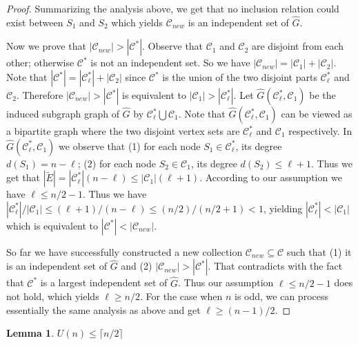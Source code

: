 \documentclass[11pt,letterpaper]{article}
\newtheorem{lemma}{Lemma}
\begin{document}
\begin{proof}
Summarizing the analysis above, we get that no inclusion relation could exist between $S_1$ and $S_2$
which yields $\mathcal{C}_{new} $ is an independent set of $\widehat{G}$.

Now we prove that $|\mathcal{C}_{new} |>|\mathcal{C}^* | $. Observe that
$\mathcal{C}_1$ and $\mathcal{C}_2$ are disjoint from each other; otherwise
 $\mathcal{C}^*$ is not an independent set. So we have $|\mathcal{C}_{new}|=|\mathcal{C}_1|+|\mathcal{C}_2|$.
Note that $|\mathcal{C}^*|=|\mathcal{C}^*_\ell|+|\mathcal{C}_2|$ since
$\mathcal{C}^*$ is the union of the two disjoint parts $\mathcal{C}^*_\ell$ and $\mathcal{C}_2$.
Therefore
$|\mathcal{C}_{new} |>|\mathcal{C}^* | $ is equivalent to $|\mathcal{C}_1 |>|\mathcal{C}^*_\ell | $.
Let $ \widehat{G}(\mathcal{C}^*_\ell, \mathcal{C}_1)$ be the
induced subgraph graph of $\widehat{G}$ by $\mathcal{C}^*_\ell \bigcup \mathcal{C}_1$.
Note that $ \widehat{G}(\mathcal{C}^*_\ell, \mathcal{C}_1)$ can be viewed as
a bipartite graph where the two disjoint vertex sets are $\mathcal{C}^*_\ell $ and $\mathcal{C}_1$
respectively.
In $ \widehat{G}(\mathcal{C}^*_\ell, \mathcal{C}_1)$
we observe that (1) for each node $S_1 \in \mathcal{C}^*_\ell$, its degree
$d(S_1)=n-\ell$; (2) for each node $S_2 \in \mathcal{C}_1$, its degree $d(S_2) \le \ell+1$.
Thus we get that $ |\widetilde{E}|=|\mathcal{C}^*_\ell| (n-\ell) \le |\mathcal{C}_1|(\ell+1) $.
According to our assumption we have $\ell \le n/2-1$.
Thus we have \\ $|\mathcal{C}^*_\ell|/|\mathcal{C}_1| \le (\ell+1)/ (n-\ell) \le (n/2)/(n/2+1)<1$,
 yielding $|\mathcal{C}^*_\ell|< |\mathcal{C}_1|$ which is equivalent to
$|\mathcal{C}^* | < |\mathcal{C}_{new} | $.

So far we have successfully constructed a new collection $\mathcal{C}_{new} \subseteq \mathcal{C}$ 
such that (1) it is an independent set of $\widehat{G}$ and (2) $ |\mathcal{C}_{new} |>|\mathcal{C}^* |$.
That contradicts with the fact that $\mathcal{C}^*$ is a largest independent set of $\widehat{G}$.
Thus our assumption $\ell \le n/2-1$ does not hold, which yields $\ell \ge n/2$.
For the case when $n$ is odd, we can process essentially the same analysis as above and get $\ell \ge (n-1)/2$. 
\end{proof}

\begin{lemma}\label{lem:Upper-n}
$U(n) \le  \lceil n/2 \rceil $
\end{lemma}
\end{document}
